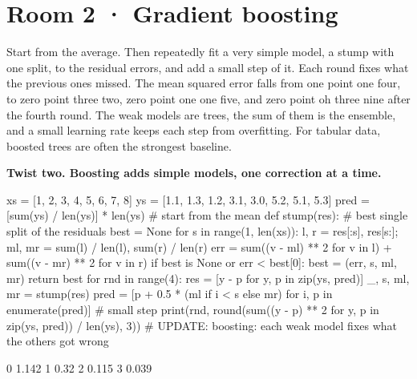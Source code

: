 \documentclass[11pt,a4paper]{report}
\begin{document}
\section*{Room 2 · Gradient boosting}
Start from the average. Then repeatedly fit a very simple model, a stump with one split, to the residual errors, and add a small step of it. Each round fixes what the previous ones missed. The mean squared error falls from one point one four, to zero point three two, zero point one one five, and zero point oh three nine after the fourth round. The weak models are trees, the sum of them is the ensemble, and a small learning rate keeps each step from overfitting. For tabular data, boosted trees are often the strongest baseline.
\begin{tcolorbox}[colback=yellow!12,colframe=orange!70!black,boxrule=0.4pt,left=4pt,right=4pt,top=2pt,bottom=2pt]\textbf{Twist two. Boosting adds simple models, one correction at a time.}\end{tcolorbox}
\begin{Code}
xs = [1, 2, 3, 4, 5, 6, 7, 8]
ys = [1.1, 1.3, 1.2, 3.1, 3.0, 5.2, 5.1, 5.3]
pred = [sum(ys) / len(ys)] * len(ys)        # start from the mean
def stump(res):                             # best single split of the residuals
    best = None
    for s in range(1, len(xs)):
        l, r = res[:s], res[s:]; ml, mr = sum(l) / len(l), sum(r) / len(r)
        err = sum((v - ml) ** 2 for v in l) + sum((v - mr) ** 2 for v in r)
        if best is None or err < best[0]: best = (err, s, ml, mr)
    return best
for rnd in range(4):
    res = [y - p for y, p in zip(ys, pred)]
    _, s, ml, mr = stump(res)
    pred = [p + 0.5 * (ml if i < s else mr) for i, p in enumerate(pred)]   # small step
    print(rnd, round(sum((y - p) ** 2 for y, p in zip(ys, pred)) / len(ys), 3))
# UPDATE: boosting: each weak model fixes what the others got wrong
\end{Code}
\begin{Out}
0 1.142
1 0.32
2 0.115
3 0.039
\end{Out}
\end{document}
